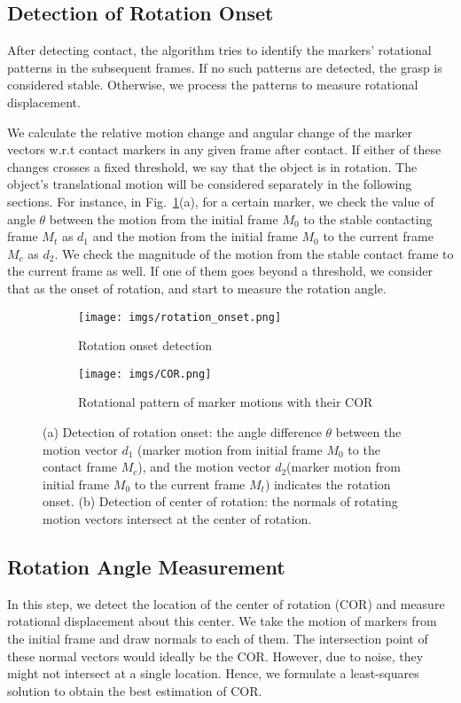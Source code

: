 \subsection{Detection of Rotation Onset}
After detecting contact, the algorithm tries to identify the markers' rotational patterns in the subsequent frames. If no such patterns are detected, the grasp is considered stable. Otherwise, we process the patterns to measure rotational displacement.

We calculate the relative motion change and angular change of the marker vectors w.r.t contact markers in any given frame after contact. If either of these changes crosses a fixed threshold, we say that the object is in rotation. The object's translational motion will be considered separately in the following sections.
For instance, in Fig.~\ref{fig:rotation_onset}(a), for a certain marker, we check the value of angle $\theta$ between the motion from the initial frame $M_0$ to the stable contacting frame $M_t$ as $d_1$ and the motion from the initial frame $M_0$ to the current frame $M_c$ as $d_2$. We check the magnitude of the motion from the stable contact frame to the current frame as well. If one of them goes beyond a threshold, we consider that as the onset of rotation, and start to measure the rotation angle.
\begin{figure}[t]
    \begin{subfigure}{0.45\linewidth}
        \texttt{[image: imgs/rotation\_onset.png]}
        \caption{Rotation onset detection}
    \end{subfigure}
    \hfill
    \begin{subfigure}{0.45\linewidth}
        \texttt{[image: imgs/COR.png]}
        \caption{Rotational pattern of marker motions with their COR}
    \end{subfigure}
    \caption{(a) Detection of rotation onset: the angle difference $\theta$ between the motion vector $d_1$ (marker motion from initial frame $M_0$ to the contact frame $M_c$), and the motion vector $d_2$(marker motion from initial frame $M_0$ to the current frame $M_t$) indicates the rotation onset. (b) Detection of center of rotation: the normals of rotating motion vectors intersect at the center of rotation.}
    \label{fig:rotation_onset}
    \vspace{-2mm}
\end{figure}

\subsection{Rotation Angle Measurement}
In this step, we detect the location of the center of rotation (COR) and measure rotational displacement about this center. We take the motion of markers from the initial frame and draw normals to each of them. The intersection point of these normal vectors would ideally be the COR. However, due to noise, they might not intersect at a single location. Hence, we formulate a least-squares solution to obtain the best estimation of COR. 

